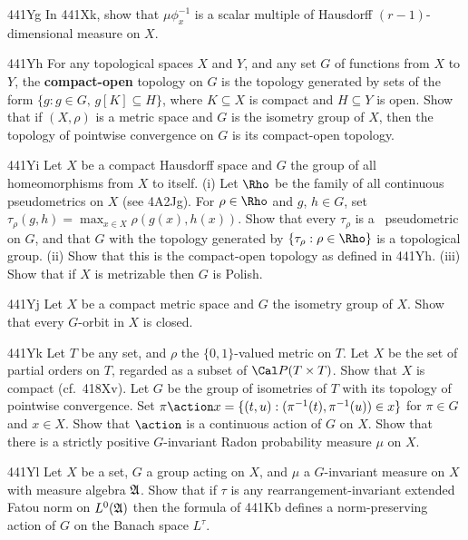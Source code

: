 {\spheader 441Yg In 441Xk, show that $\mu\phi_x^{-1}$ is a scalar
multiple of Hausdorff $(r-1)$-dimensional measure on $X$.

\spheader 441Yh For any topological spaces $X$ and $Y$, and any set $G$
of functions from $X$ to $Y$, the {\bf compact-open} topology on $G$ is
the topology generated by sets of the form
$\{g:g\in G,\,g[K]\subseteq H\}$, where $K\subseteq X$ is compact and
$H\subseteq Y$ is open.   Show that if $(X,\rho)$ is a metric space and
$G$ is the isometry group of $X$, then the topology of pointwise
convergence on $G$ is its compact-open topology.


\spheader 441Yi Let $X$ be a compact Hausdorff space and $G$ the group
of all homeomorphisms from $X$ to itself.   (i) Let $\Rho$ be the family
of
all continuous pseudometrics on $X$ (see 4A2Jg).   For $\rho\in\Rho$ and
$g$, $h\in G$, set $\tau_{\rho}(g,h)=\max_{x\in X}\rho(g(x),h(x))$.
Show that every $\tau_{\rho}$ is a \rti\ pseudometric on $G$, and that
$G$ with the topology generated by $\{\tau_{\rho}:\rho\in\Rho\}$ is a
topological group.
(ii) Show that this is the compact-open topology as defined in 441Yh.
(iii) Show that if $X$ is metrizable then $G$ is Polish.

\spheader 441Yj Let $X$ be a compact metric space and $G$ the isometry
group of $X$.   Show that every $G$-orbit in $X$ is closed.

\spheader 441Yk Let $T$ be any set, and $\rho$ the $\{0,1\}$-valued
metric on $T$.   Let $X$ be the set of partial orders on $T$, regarded
as a subset of $\Cal P(T\times T)$.   Show that $X$ is compact (cf.\
418Xv).   Let $G$ be the group of isometries of $T$ with its topology of
pointwise convergence.   Set
$\pi\action x=\{(t,u):(\pi^{-1}(t),\pi^{-1}(u))\in x\}$ for
$\pi\in G$ and $x\in X$.   Show that $\action$ is a continuous action of
$G$ on $X$.   Show that there is a strictly positive $G$-invariant Radon
probability measure $\mu$ on $X$.

\spheader 441Yl Let $X$ be a set, $G$ a group acting on $X$, and $\mu$ a
$G$-invariant measure on $X$ with measure algebra $\frak A$.   Show that
if $\tau$ is any rearrangement-invariant extended Fatou norm on
$L^0(\frak A)$ then the formula of 441Kb defines a norm-preserving
action of $G$ on the Banach space $L^{\tau}$.

}

